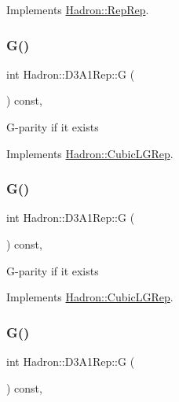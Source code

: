 Implements \mbox{\hyperlink{structHadron_1_1RepRep_a92c8802e5ed7afd7da43ccfd5b7cd92b}{Hadron\+::\+Rep\+Rep}}.

\mbox{\label{structHadron_1_1D3A1Rep_a4ad1cf7ca7e11dccb203e9ed21aa11c6}} 
\subsubsection{\texorpdfstring{G()}{G()}\hspace{0.1cm}{\footnotesize\ttfamily [1/3]}}
{\footnotesize\ttfamily int Hadron\+::\+D3\+A1\+Rep\+::G (\begin{DoxyParamCaption}{ }\end{DoxyParamCaption}) const\hspace{0.3cm}{\ttfamily [inline]}, {\ttfamily [virtual]}}

G-\/parity if it exists 

Implements \mbox{\hyperlink{structHadron_1_1CubicLGRep_ace26f7b2d55e3a668a14cb9026da5231}{Hadron\+::\+Cubic\+L\+G\+Rep}}.

\mbox{\label{structHadron_1_1D3A1Rep_a4ad1cf7ca7e11dccb203e9ed21aa11c6}} 
\subsubsection{\texorpdfstring{G()}{G()}\hspace{0.1cm}{\footnotesize\ttfamily [2/3]}}
{\footnotesize\ttfamily int Hadron\+::\+D3\+A1\+Rep\+::G (\begin{DoxyParamCaption}{ }\end{DoxyParamCaption}) const\hspace{0.3cm}{\ttfamily [inline]}, {\ttfamily [virtual]}}

G-\/parity if it exists 

Implements \mbox{\hyperlink{structHadron_1_1CubicLGRep_ace26f7b2d55e3a668a14cb9026da5231}{Hadron\+::\+Cubic\+L\+G\+Rep}}.

\mbox{\label{structHadron_1_1D3A1Rep_a4ad1cf7ca7e11dccb203e9ed21aa11c6}} 
\subsubsection{\texorpdfstring{G()}{G()}\hspace{0.1cm}{\footnotesize\ttfamily [3/3]}}
{\footnotesize\ttfamily int Hadron\+::\+D3\+A1\+Rep\+::G (\begin{DoxyParamCaption}{ }\end{DoxyParamCaption}) const\hspace{0.3cm}{\ttfamily [inline]}, {\ttfamily [virtual]}}

